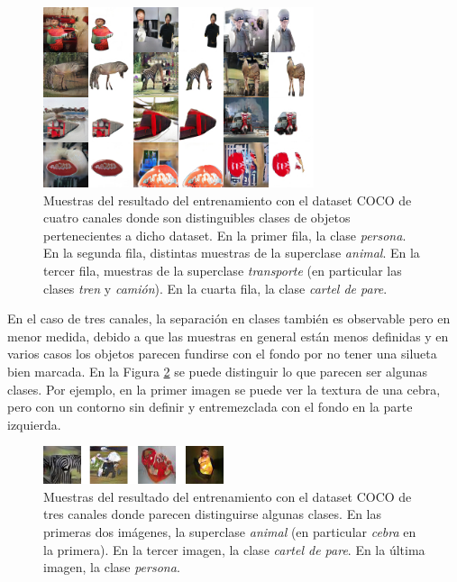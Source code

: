 \documentclass[spanish]{report}
\begin{document}
\begin{figure}[h]
\centering
 \includegraphics[width=300px]{resultado_segmentacion_coco2.jpg}
   \caption{Muestras del resultado del entrenamiento con el dataset COCO de cuatro canales donde son distinguibles clases de objetos pertenecientes a dicho dataset. En la primer fila, la clase \textit{persona}. En la segunda fila, distintas muestras de la superclase \textit{animal}. En la tercer fila, muestras de la superclase \textit{transporte} (en particular las clases \textit{tren} y \textit{camión}). En la cuarta fila, la clase \textit{cartel de pare}.}
  \label{fig:resultado_segmentacion_coco2}
\end{figure}

\enlargethispage{0.3in}
 En el caso de tres canales, la separación en clases también es observable pero en menor medida, debido a que las muestras en general están menos definidas y en varios casos los objetos parecen fundirse con el fondo por no tener una silueta bien marcada. En la Figura \ref{fig:comparacion_coco_3chan} se puede distinguir lo que parecen ser algunas clases. Por ejemplo, en la primer imagen se puede ver la textura de una cebra, pero con un contorno sin definir y entremezclada con el fondo en la parte izquierda.

\begin{figure}[H]
\centering
 \includegraphics[width=200px]{comparacion_coco_3chan.jpg}
   \caption{Muestras del resultado del entrenamiento con el dataset COCO de tres canales donde parecen distinguirse algunas clases. En las primeras dos imágenes, la superclase \textit{animal} (en particular \textit{cebra} en la primera). En la tercer imagen, la clase \textit{cartel de pare}. En la última imagen, la clase \textit{persona}.}
  \label{fig:comparacion_coco_3chan}
\end{figure}
\end{document}
